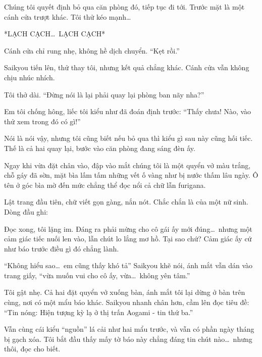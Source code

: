 \documentclass[../main.tex]{subfiles}
\begin{document}
Chúng tôi quyết định bỏ qua căn phòng đó, tiếp tục đi tới. Trước mặt là một cánh cửa trượt khác. Tôi thử kéo mạnh\dots

*LẠCH CẠCH\dots\ LẠCH CẠCH*

Cánh cửa chỉ rung nhẹ, không hề dịch chuyển. ``Kẹt rồi.''

Saikyou tiến lên, thử thay tôi, nhưng kết quả chẳng khác. Cánh cửa vẫn không chịu nhúc nhích.

Tôi thở dài. ``Đừng nói là lại phải quay lại phòng ban nãy nha?''

Em tôi chống hông, liếc tôi kiểu như đã đoán định trước: ``Thấy chưa! Nào, vào thử xem trong đó có gì!''

Nói là nói vậy, nhưng tôi cũng biết nếu bỏ qua thì kiểu gì sau này cũng hối tiếc. Thế là cả hai quay lại, bước vào căn phòng đang sáng đèn ấy.

Ngay khi vừa đặt chân vào, đập vào mắt chúng tôi là một quyển vở màu trắng, chỗ gáy đã sờn, mặt bìa lấm tấm những vết ố vàng như bị nước thấm lâu ngày. Ô tên ở góc bìa mờ đến mức chẳng thể đọc nổi cả chữ lẫn furigana.

Lật trang đầu tiên, chữ viết gọn gàng, nắn nót. Chắc chắn là của một nữ sinh. Dòng đầu ghi:


Đọc xong, tôi lặng im. Đáng ra phải mừng cho cô gái ấy mới đúng\dots\ nhưng một cảm giác tiếc nuối len vào, lẫn chút lo lắng mơ hồ. Tại sao chứ? Cảm giác ấy cứ như báo trước điều gì đó chẳng lành.

``Không hiểu sao\dots\ em cũng thấy khó tả'' Saikyou khẽ nói, ánh mắt vẫn dán vào trang giấy, ``vừa muốn vui cho cô ấy, vừa\dots\ không yên tâm.''

Tôi gật nhẹ. Cả hai đặt quyển vở xuống bàn, ánh mắt tôi lại dừng ở bàn trên cùng, nơi có một mẩu báo khác. Saikyou nhanh chân hơn, cầm lên đọc tiêu đề: ``{\vnmsans Tin nóng: Hiện tượng kỳ lạ ở thị trấn Aogami - tin thứ ba.}''

Vẫn cùng cái kiểu ``nguồn'' lá cải như hai mẩu trước, và vẫn có phần ngày tháng bị gạch xóa. Tôi bắt đầu thấy mấy tờ báo này chẳng đáng tin chút nào\dots\ nhưng thôi, đọc cho biết.

\end{document}
